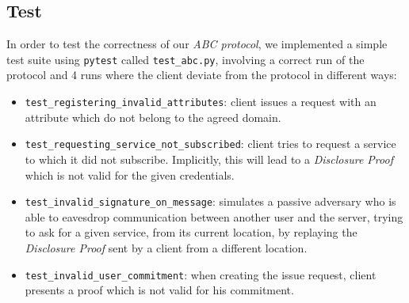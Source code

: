 \documentclass[10pt,conference,compsocconf]{IEEEtran}
\begin{document}
\subsection{Test}
In order to test the correctness of our \textit{ABC protocol}, we implemented a simple test suite using \texttt{pytest} called \texttt{test\_abc.py},
involving a correct run of the protocol and 4 runs where the client deviate from the protocol in different ways:
\begin{itemize}
    \item \texttt{test\_registering\_invalid\_attributes}: client issues a request with an attribute which do not belong to the agreed domain.
    \item \texttt{test\_requesting\_service\_not\_subscribed}: client tries to request a service to which it did not subscribe.
    Implicitly, this will lead to a \textit{Disclosure Proof} which is not valid for the given credentials.
    \item \texttt{test\_invalid\_signature\_on\_message}: simulates a passive adversary who is able to eavesdrop
    communication between another user and the server, trying to ask for a given service, from its current
    location, by replaying the \textit{Disclosure Proof} sent by a client from a different location.
    \item \texttt{test\_invalid\_user\_commitment}: when creating the issue request, client presents a proof which is not valid for his commitment.
\end{itemize}
\end{document}
